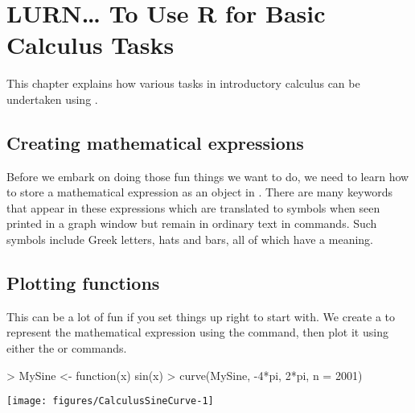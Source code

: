 



 
\chapter{LURN\ldots{} To Use R for Basic Calculus Tasks} 
\label{Calculus} 
 



 
This chapter explains how various tasks in introductory calculus can be undertaken using \R{}. 
 
 
\section{Creating mathematical expressions} 
 
Before we embark on doing those fun things we want to do, we need to learn how to store a mathematical expression as an object in \R{}. There are many keywords that appear in these expressions which are translated to symbols when seen printed in a graph window but remain in ordinary text in \R{} commands. Such symbols include Greek letters, hats and bars, all of which have a meaning. 
 
\section{Plotting functions} 
 
This can be a lot of fun if you set things up right to start with. We create a  to represent the mathematical expression using the  command, then plot it using either the  or  commands. 

\begin{Schunk}
\begin{Sinput}
> MySine <- function(x){ sin(x)} 
> curve(MySine, -4*pi, 2*pi, n = 2001) 
\end{Sinput}

\texttt{[image: figures/CalculusSineCurve-1]} \end{Schunk}

 
